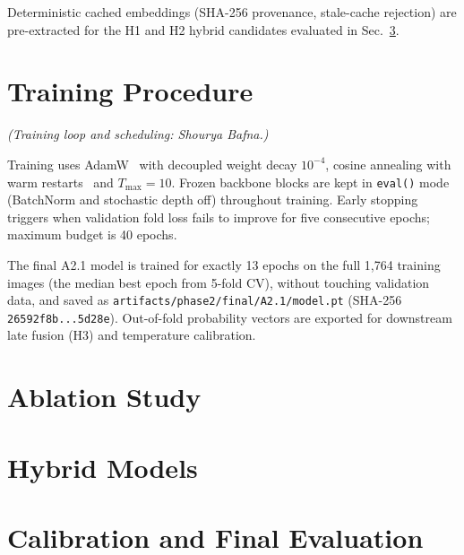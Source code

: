 \documentclass[conference]{IEEEtran}
\begin{document}
Deterministic cached embeddings (SHA-256 provenance, stale-cache rejection) are pre-extracted for the H1 and H2 hybrid candidates evaluated in Sec.~\ref{sec:hybrid}.

\section{Training Procedure}
\label{sec:training}
\textit{(Training loop and scheduling: Shourya Bafna.)}

Training uses AdamW~\cite{loshchilov2019adamw} with decoupled weight decay $10^{-4}$, cosine annealing with warm restarts~\cite{loshchilov2017sgdr} and $T_{\max}=10$. Frozen backbone blocks are kept in \texttt{eval()} mode (BatchNorm and stochastic depth off) throughout training. Early stopping triggers when validation fold loss fails to improve for five consecutive epochs; maximum budget is 40 epochs.

The final A2.1 model is trained for exactly 13 epochs on the full 1,764 training images (the median best epoch from 5-fold CV), without touching validation data, and saved as \texttt{artifacts/phase2/final/A2.1/model.pt} (SHA-256 \texttt{26592f8b...5d28e}). Out-of-fold probability vectors are exported for downstream late fusion (H3) and temperature calibration.

\section{Ablation Study}
\label{sec:ablation}


\section{Hybrid Models}
\label{sec:hybrid}


\section{Calibration and Final Evaluation}
\label{sec:eval}

\end{document}
